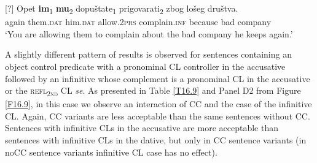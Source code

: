 \begin{exe}


[?]{
\gll Opet \textbf{im}\textsubscript{1} \textbf{mu}\textsubscript{2} dopuštate\textsubscript{1} prigovarati\textsubscript{2} zbog lošeg društva. \\
 again them.\textsc{dat} him.\textsc{dat} allow.2\textsc{prs} complain.\textsc{inf} because bad company \\ 
\glt ‘You are allowing them to complain about the bad company he keeps again.’}

\end{exe}

\noindent A slightly different pattern of results is observed for sentences containing an object control predicate with a pronominal CL controller in the accusative followed by an infinitive whose complement is a pronominal CL in the accusative or the \textsc{refl\textsubscript{2nd}} CL \textit{se}. As presented in Table \ref{T16.9} and Panel D2 from Figure \ref{F16.9}, in this case we observe an interaction of CC and the case of the infinitive CL. Again, CC variants are less acceptable than the same sentences without CC. Sentences with infinitive CLs in the accusative are more acceptable than sentences with infinitive CLs in the dative, but only in CC sentence variants (in noCC sentence variants infinitive CL case has no effect). 

